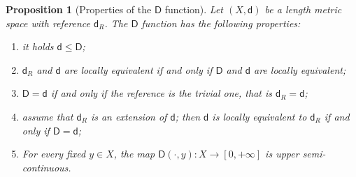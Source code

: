 \documentclass[11pt,a4paper]{article}
\theoremstyle{plain}
\newtheorem{proposition}[theorem]{Proposition}
\theoremstyle{definition}
\theoremstyle{remark}
\numberwithin{equation}{section}
\newcommand{\sfd}{\mathsf d}
\newcommand{\sfD}{\mathsf D}
\begin{document}
\begin{proposition}[Properties of the $\sfD$ function]\label{prop:propertiesD}
Let $(X,\sfd)$ be a length metric space with reference $\sfd_R$. The $\sfD$ function has the following properties:
\begin{enumerate}[label = (\roman*)]
\item \label{i:propertiesD1} it holds  $\sfd \leq \sfD$;
\item \label{i:propertiesD2} $\sfd_R$ and $\sfd$ are locally equivalent if and only if $\sfD$ and $\sfd$ are locally equivalent;
\item \label{i:propertiesD3} $\sfD= \sfd$ if and only if the reference is the trivial one, that is $\sfd_R=\sfd$;
\item \label{i:propertiesD4} assume that $\sfd_R$ is an extension of $\sfd$; then $\sfd$ is locally equivalent to $\sfd_R$ if and only if $\sfD=\sfd$;
\item \label{i:propertiesD5} For every fixed $y\in X$, the map $\sfD(\cdot, y) :X  \to [0,+\infty]$ is upper semi-continuous.
\end{enumerate}
\end{proposition}
\end{document}
